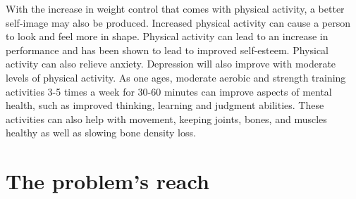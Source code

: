 \documentclass[12pt,article]{IEEEtran}
\begin{document}
	With the increase in weight control that comes with physical activity, a better self-image may also be produced.  Increased physical activity can cause a person to look and feel more in shape.  Physical activity can lead to an increase in performance and has been shown to lead to improved self-esteem.  Physical activity can also relieve anxiety. \cite{13} Depression will also improve with moderate levels of physical activity. \cite{16, p.806}
	As one ages, moderate aerobic and strength training activities 3-5 times a week for 30-60 minutes can improve aspects of mental health, such as improved thinking, learning and judgment abilities. These activities can also help with movement, keeping joints, bones, and muscles healthy as well as slowing bone density loss. \cite{18}

	\section{The problem's reach}




\end{document}

